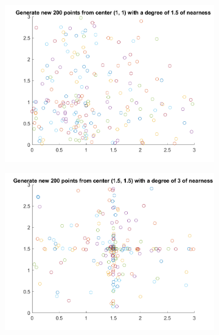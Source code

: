 \begin{figure}
  \begin{subfigure}[b]{0.4\textwidth}
    \includegraphics[width=\textwidth]{img/cbr-4}
    \label{fig:cbr-4}
  \end{subfigure}
  \begin{subfigure}[b]{0.4\textwidth}
    \includegraphics[width=\textwidth]{img/cbr-5}
    \label{fig:cbr-5}
  \end{subfigure}


\end{figure}
